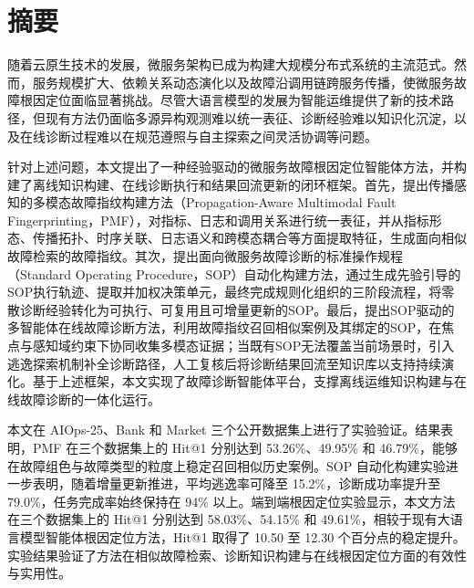 
\maketitle%
\MAKETITLE%
\makedeclaration%
\intobmk\chapter*{\texorpdfstring{摘\quad 要}{摘要}}%
\setcounter{page}{1}%

随着云原生技术的发展，微服务架构已成为构建大规模分布式系统的主流范式。然而，服务规模扩大、依赖关系动态演化以及故障沿调用链跨服务传播，使微服务故障根因定位面临显著挑战。尽管大语言模型的发展为智能运维提供了新的技术路径，但现有方法仍面临多源异构观测难以统一表征、诊断经验难以知识化沉淀，以及在线诊断过程难以在规范遵照与自主探索之间灵活协调等问题。

针对上述问题，本文提出了一种经验驱动的微服务故障根因定位智能体方法，并构建了离线知识构建、在线诊断执行和结果回流更新的闭环框架。首先，提出传播感知的多模态故障指纹构建方法（Propagation-Aware Multimodal Fault Fingerprinting，PMF），对指标、日志和调用关系进行统一表征，并从指标形态、传播拓扑、时序关联、日志语义和跨模态耦合等方面提取特征，生成面向相似故障检索的故障指纹。其次，提出面向微服务故障诊断的标准操作规程（Standard Operating Procedure，SOP）自动化构建方法，通过生成先验引导的SOP执行轨迹、提取并加权决策单元，最终完成规则化组织的三阶段流程，将零散诊断经验转化为可执行、可复用且可增量更新的SOP。最后，提出SOP驱动的多智能体在线故障诊断方法，利用故障指纹召回相似案例及其绑定的SOP，在焦点与感知域约束下协同收集多模态证据；当既有SOP无法覆盖当前场景时，引入逃逸探索机制补全诊断路径，人工复核后将诊断结果回流至知识库以支持持续演化。基于上述框架，本文实现了故障诊断智能体平台，支撑离线运维知识构建与在线故障诊断的一体化运行。

本文在 AIOps-25、Bank 和 Market 三个公开数据集上进行了实验验证。结果表明，PMF 在三个数据集上的 Hit@1 分别达到 53.26\%、49.95\% 和 46.79\%，能够在故障组色与故障类型的粒度上稳定召回相似历史案例。SOP 自动化构建实验进一步表明，随着增量更新推进，平均逃逸率可降至 15.2\%，诊断成功率提升至 79.0\%，任务完成率始终保持在 94\% 以上。端到端根因定位实验显示，本文方法在三个数据集上的 Hit@1 分别达到 58.03\%、54.15\% 和 49.61\%，相较于现有大语言模型智能体根因定位方法，Hit@1 取得了 10.50 至 12.30 个百分点的稳定提升。实验结果验证了方法在相似故障检索、诊断知识构建与在线根因定位方面的有效性与实用性。




